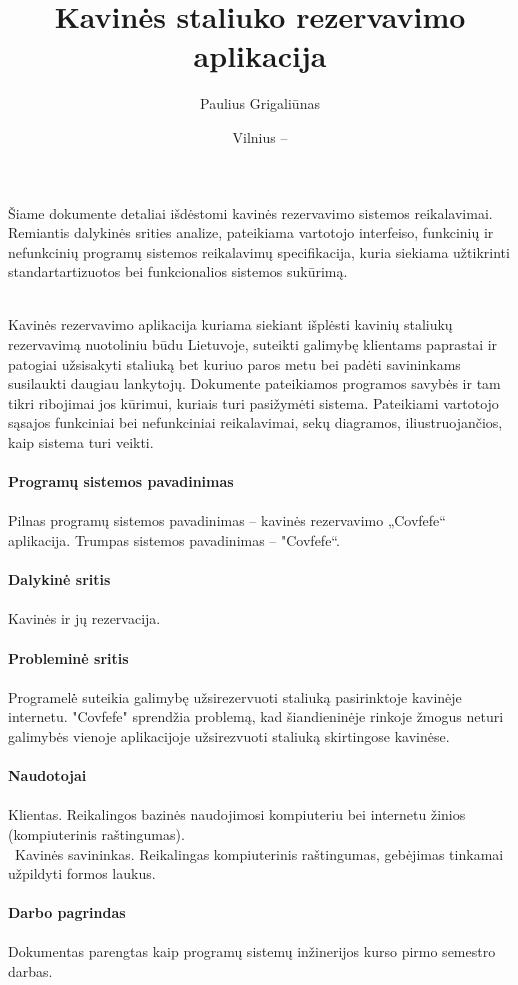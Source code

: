 \documentclass{VUMIFPSkursinis}
\title{Kavinės staliuko rezervavimo aplikacija}
\author{Paulius Grigaliūnas}
\date{Vilnius – \the\year}
\begin{document}
\maketitle
\cleardoublepage{}
\setcounter{page}{2}



\noindent
Šiame dokumente detaliai išdėstomi kavinės rezervavimo sistemos reikalavimai. Remiantis dalykinės srities analize, pateikiama vartotojo interfeiso, funkcinių ir nefunkcinių programų sistemos reikalavimų specifikacija, kuria siekiama užtikrinti standartartizuotos bei funkcionalios sistemos sukūrimą.\\\\




\tableofcontents

\noindent
Kavinės rezervavimo aplikacija kuriama siekiant išplėsti kavinių staliukų rezervavimą nuotoliniu būdu Lietuvoje, suteikti galimybę klientams paprastai ir patogiai užsisakyti staliuką bet kuriuo paros metu bei padėti savininkams susilaukti daugiau lankytojų. 
\newline
Dokumente pateikiamos programos savybės ir tam tikri ribojimai jos kūrimui, kuriais turi pasižymėti sistema. Pateikiami vartotojo sąsajos funkciniai bei nefunkciniai reikalavimai, sekų diagramos, iliustruojančios, kaip sistema turi veikti.\\\\
{\bfseries Programų sistemos pavadinimas}\\\\
Pilnas programų sistemos pavadinimas – kavinės rezervavimo „Covfefe“ aplikacija. Trumpas sistemos pavadinimas – "Covfefe“.\\\\
{\bfseries Dalykinė sritis}\\\\
Kavinės ir jų rezervacija.\\\\
\noindent
{\bfseries Probleminė sritis}\\\\
Programelė̇ suteikia galimybę užsirezervuoti staliuką pasirinktoje kavinėje internetu. "Covfefe" sprendžia problemą, kad šiandieninėje rinkoje žmogus neturi galimybės vienoje aplikacijoje užsirezvuoti staliuką skirtingose kavinėse.\\\\
{\bfseries Naudotojai}\\\\
Klientas. Reikalingos bazinės naudojimosi kompiuteriu bei internetu žinios (kompiuterinis raštingumas).\\\
Kavinės savininkas. Reikalingas kompiuterinis raštingumas, gebėjimas tinkamai užpildyti formos laukus.\\\\
{\bfseries Darbo pagrindas}\\\\
Dokumentas parengtas kaip programų sistemų inžinerijos kurso pirmo semestro darbas.
\newline
\end{document}
